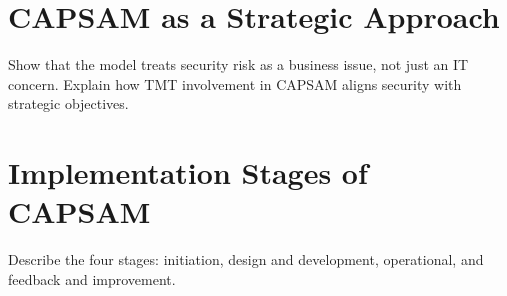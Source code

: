 \section{CAPSAM as a Strategic Approach}
Show that the model treats security risk as a business issue, not just an IT concern. Explain how TMT involvement in CAPSAM aligns security with strategic objectives.

\section{Implementation Stages of CAPSAM}
Describe the four stages: initiation, design and development, operational, and feedback and improvement.